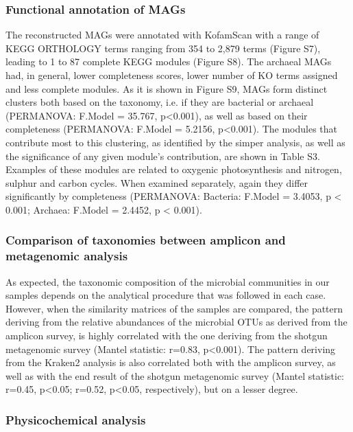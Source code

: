 \subsubsection*{Functional annotation of MAGs}

   The reconstructed MAGs were annotated with KofamScan with a range of KEGG ORTHOLOGY terms ranging from 354 to 2,879 terms (Figure S7), leading to 1 to 87 complete KEGG modules (Figure S8).
   The archaeal MAGs had, in general, lower completeness scores, lower number of KO terms assigned and less complete modules.
   As it is shown in Figure S9, MAGs form distinct clusters both based on the taxonomy, i.e. if they are bacterial or archaeal (PERMANOVA: F.Model = 35.767, p<0.001), 
   as well as based on their completeness (PERMANOVA: F.Model = 5.2156, p<0.001). 
   The modules that contribute most to this clustering, as identified by the simper analysis, as well as the significance of any given module’s contribution, are shown in Table S3. 
   Examples of these modules are related to oxygenic photosynthesis and nitrogen, sulphur and carbon cycles. 
   When examined separately, again they differ significantly by completeness (PERMANOVA: Bacteria: F.Model = 3.4053, p < 0.001; Archaea: F.Model = 2.4452, p < 0.001).


\subsubsection*{Comparison of taxonomies between amplicon and metagenomic analysis}

   As expected, the taxonomic composition of the microbial communities in our samples depends on the analytical procedure that was followed in each case. 
   However, when the similarity matrices of the samples are compared, the pattern deriving from the relative abundances of the microbial OTUs as derived from the amplicon survey, 
   is highly correlated with the one deriving from the shotgun metagenomic survey (Mantel statistic: r=0.83, p<0.001). 
   The pattern deriving from the Kraken2 analysis is also correlated both with the amplicon survey, as well as with the end result of the shotgun metagenomic survey 
   (Mantel statistic: r=0.45, p<0.05; r=0.52, p<0.05, respectively), but on a lesser degree. 


\subsubsection*{Physicochemical analysis}


